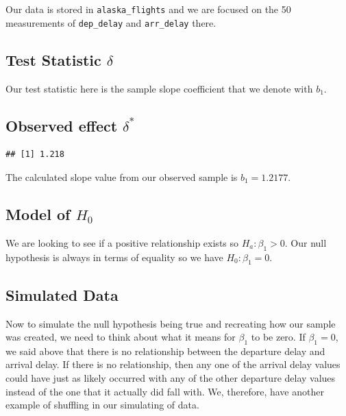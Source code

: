 \documentclass[]{tufte-book}
\newenvironment{Shaded}{\begin{snugshade}}{\end{snugshade}}
\newcommand{\KeywordTok}[1]{\textcolor[rgb]{0.13,0.29,0.53}{\textbf{{#1}}}}
\newcommand{\DecValTok}[1]{\textcolor[rgb]{0.00,0.00,0.81}{{#1}}}
\newcommand{\StringTok}[1]{\textcolor[rgb]{0.31,0.60,0.02}{{#1}}}
\newcommand{\NormalTok}[1]{{#1}}
\begin{document}
Our data is stored in \texttt{alaska\_flights} and we are focused on the
50 measurements of \texttt{dep\_delay} and \texttt{arr\_delay} there.

\subsection{\texorpdfstring{Test Statistic
\(\delta\)}{Test Statistic \textbackslash{}delta}}\label{test-statistic-delta-2}

Our test statistic here is the sample slope coefficient that we denote
with \(b_1\).

\subsection{\texorpdfstring{Observed effect
\(\delta^*\)}{Observed effect \textbackslash{}delta\^{}*}}\label{observed-effect-delta-2}

\begin{Shaded}
\end{Shaded}

\begin{verbatim}
## [1] 1.218
\end{verbatim}

The calculated slope value from our observed sample is \(b_1 = 1.2177\).

\subsection{\texorpdfstring{Model of
\(H_0\)}{Model of H\_0}}\label{model-of-h_0-2}

We are looking to see if a positive relationship exists so
\(H_a: \beta_1 > 0\). Our null hypothesis is always in terms of equality
so we have \(H_0: \beta_1 = 0\).

\subsection{Simulated Data}\label{simulated-data-2}

Now to simulate the null hypothesis being true and recreating how our
sample was created, we need to think about what it means for \(\beta_1\)
to be zero. If \(\beta_1 = 0\), we said above that there is no
relationship between the departure delay and arrival delay. If there is
no relationship, then any one of the arrival delay values could have
just as likely occurred with any of the other departure delay values
instead of the one that it actually did fall with. We, therefore, have
another example of shuffling in our simulating of data.
\end{document}
